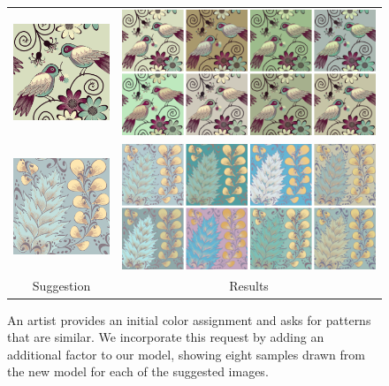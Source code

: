 \begin{figure}[ht]
\begin{tabular}{cc}
\includegraphics[width=.22\columnwidth]{figs/guidedSearch0Original}&\includegraphics[width=.7\columnwidth]{figs/guidedSearch0MMR}\vspace{0.5em}\\
\includegraphics[width=.22\columnwidth]{figs/guidedSearch1Original}&\includegraphics[width=.7\columnwidth]{figs/guidedSearch1MMR}\\
Suggestion&Results\\
\end{tabular}

\caption{An artist provides an initial color assignment and asks for patterns that are similar. We incorporate this request by adding an additional factor to our model, showing eight samples drawn from the new model for each of the suggested images.}
\label{fig:nearbySuggestions}
\vspace{-1.0em}
\end{figure}

